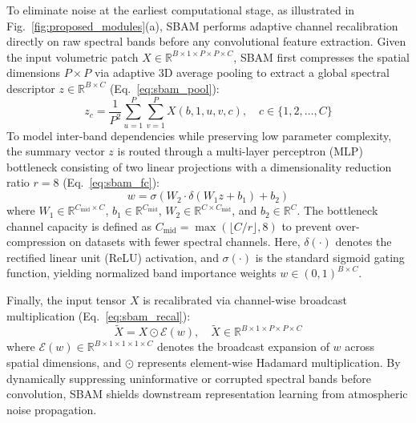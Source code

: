 \documentclass[manuscript,screen,review]{acmart}
\begin{document}
To eliminate noise at the earliest computational stage, as illustrated in Fig.~\ref{fig:proposed_modules}(a), SBAM performs adaptive channel recalibration directly on raw spectral bands before any convolutional feature extraction. Given the input volumetric patch $X \in \mathbb{R}^{B \times 1 \times P \times P \times C}$, SBAM first compresses the spatial dimensions $P \times P$ via adaptive 3D average pooling to extract a global spectral descriptor $z \in \mathbb{R}^{B \times C}$ (Eq.~\ref{eq:sbam_pool}):
\begin{equation}
\label{eq:sbam_pool}
z_c = \frac{1}{P^2} \sum_{u=1}^P \sum_{v=1}^P X(b, 1, u, v, c), \quad c \in \{1, 2, \dots, C\}
\end{equation}
To model inter-band dependencies while preserving low parameter complexity, the summary vector $z$ is routed through a multi-layer perceptron (MLP) bottleneck consisting of two linear projections with a dimensionality reduction ratio $r=8$ (Eq.~\ref{eq:sbam_fc}):
\begin{equation}
\label{eq:sbam_fc}
w = \sigma\left(W_2 \cdot \delta(W_1 z + b_1) + b_2\right)
\end{equation}
where $W_1 \in \mathbb{R}^{C_{\text{mid}} \times C}$, $b_1 \in \mathbb{R}^{C_{\text{mid}}}$, $W_2 \in \mathbb{R}^{C \times C_{\text{mid}}}$, and $b_2 \in \mathbb{R}^{C}$. The bottleneck channel capacity is defined as $C_{\text{mid}} = \max(\lfloor C / r \rfloor, 8)$ to prevent over-compression on datasets with fewer spectral channels. Here, $\delta(\cdot)$ denotes the rectified linear unit (ReLU) activation, and $\sigma(\cdot)$ is the standard sigmoid gating function, yielding normalized band importance weights $w \in (0, 1)^{B \times C}$.

Finally, the input tensor $X$ is recalibrated via channel-wise broadcast multiplication (Eq.~\ref{eq:sbam_recal}):
\begin{equation}
\label{eq:sbam_recal}
\tilde{X} = X \odot \mathcal{E}(w), \quad \tilde{X} \in \mathbb{R}^{B \times 1 \times P \times P \times C}
\end{equation}
where $\mathcal{E}(w) \in \mathbb{R}^{B \times 1 \times 1 \times 1 \times C}$ denotes the broadcast expansion of $w$ across spatial dimensions, and $\odot$ represents element-wise Hadamard multiplication. By dynamically suppressing uninformative or corrupted spectral bands before convolution, SBAM shields downstream representation learning from atmospheric noise propagation.
\end{document}

